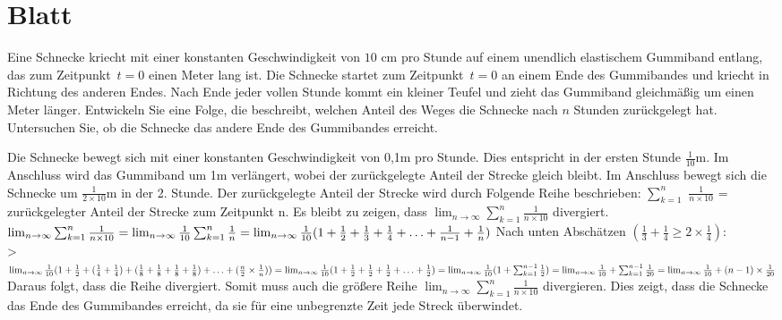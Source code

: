 \section{Blatt}

\begin{aufg}[6 Punkte] 
Eine Schnecke kriecht mit einer konstanten Geschwindigkeit von $10$ cm pro Stunde auf einem unendlich elastischem Gummiband entlang, das zum Zeitpunkt~$t=0$ einen Meter lang ist. Die Schnecke startet zum Zeitpunkt~$t=0$ an einem Ende des Gummibandes und kriecht in Richtung des anderen Endes. Nach Ende jeder vollen Stunde kommt ein kleiner Teufel und zieht das Gummiband gleichm\"a{\ss}ig um einen Meter l\"anger. Entwickeln Sie eine Folge, die beschreibt, welchen Anteil des Weges die Schnecke nach $n$ Stunden zur\"uckgelegt hat. Untersuchen Sie, ob die Schnecke das andere Ende des Gummibandes erreicht.
\end{aufg}

\bigskip

\begin{lsg} 
Die Schnecke bewegt sich mit einer konstanten Geschwindigkeit von 0,1m pro Stunde. Dies entspricht in der ersten Stunde $\frac{1}{10}$m. Im Anschluss wird das Gummiband um 1m verlängert, wobei der zurückgelegte Anteil der Strecke gleich bleibt. Im Anschluss bewegt sich die Schnecke um  $\frac{1}{2 \times 10}$m in der 2. Stunde. 
Der zurückgelegte Anteil der Strecke wird durch Folgende Reihe beschrieben: 
$\sum\nolimits_{k=1}^n$ $\frac{1}{n \times 10} $ = zurückgelegter Anteil der Strecke zum Zeitpunkt n.
Es bleibt zu zeigen, dass $\lim_{n \to \infty} \sum\nolimits_{k=1}^n \frac{1}{n \times 10}$ divergiert.\\ 
$\lim_{n \to \infty} \sum\nolimits_{k=1}^n \frac{1}{n \times 10} \\ 
= \lim_{n \to \infty}  \frac{1}{10}\sum\nolimits_{k=1}^n \frac{1}{n} \\
= \lim_{n \to \infty} \frac{1}{10}(1+\frac{1}{2}+\frac{1}{3}+\frac{1}{4}+ \ldots+\frac{1}{n-1}+\frac{1}{n}) \\$
Nach unten Abschätzen $(\frac{1}{3}+\frac{1}{4}\geq 2 \times \frac{1}{4})$: \\
\textgreater \ $ \lim_{n \to \infty} \frac{1}{10} (1+\frac{1}{2}+ (\frac{1}{4}+\frac{1}{4})+(\frac{1}{8}+\frac{1}{8}+\frac{1}{8}+\frac{1}{8})+\ldots + (\frac{n}{2} \times \frac{1}{n})) \\
= \lim_{n \to \infty} \frac{1}{10} (1+\frac{1}{2}+\frac{1}{2}+\frac{1}{2}+\ldots +\frac{1}{2}) \\
= \lim_{n \to \infty} \frac{1}{10} (1+ \sum\nolimits_{k=1}^{n-1} \frac{1}{2})\\
=\lim_{n \to \infty} \frac{1}{10} + \sum\nolimits_{k=1}^{n-1} \frac{1}{20} \\
=\lim_{n \to \infty} \frac{1}{10} + (n-1) \times \frac{1}{20}$
Daraus folgt, dass die Reihe divergiert. Somit muss auch die größere Reihe 
$\lim_{n \to \infty} \sum\nolimits_{k=1}^n \frac{1}{n \times 10}$ divergieren.
Dies zeigt, dass die Schnecke das Ende des Gummibandes erreicht, da sie für eine unbegrenzte Zeit jede Streck überwindet. 
\end{lsg}

